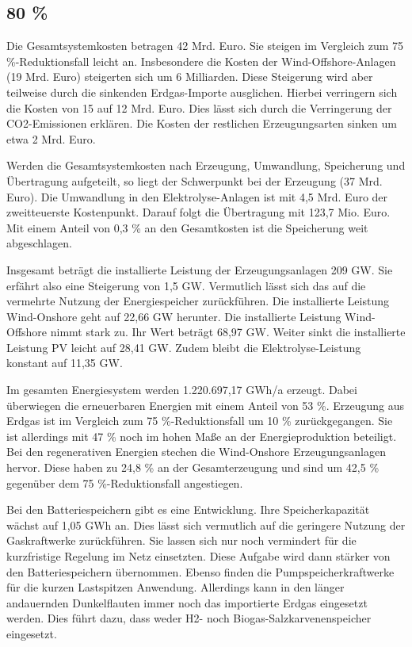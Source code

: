 

\subsection{80 \%}
Die Gesamtsystemkosten betragen 42 Mrd. Euro. Sie steigen im Vergleich zum 75 \%-Reduktionsfall leicht an. Insbesondere die Kosten der Wind-Offshore-Anlagen (19 Mrd. Euro) steigerten sich um 6 Milliarden. Diese Steigerung wird aber teilweise durch die sinkenden Erdgas-Importe ausglichen. Hierbei verringern sich die Kosten von 15 auf 12 Mrd. Euro. Dies lässt sich durch die Verringerung der CO2-Emissionen erklären. Die Kosten der restlichen Erzeugungsarten sinken um etwa 2 Mrd. Euro.

Werden die Gesamtsystemkosten nach Erzeugung, Umwandlung, Speicherung und Übertragung aufgeteilt, so liegt der Schwerpunkt bei der Erzeugung (37 Mrd. Euro). Die Umwandlung in den Elektrolyse-Anlagen ist mit 4,5 Mrd. Euro der zweitteuerste Kostenpunkt. Darauf folgt die Übertragung mit 123,7 Mio. Euro. Mit einem Anteil von 0,3 \% an den Gesamtkosten ist die Speicherung weit abgeschlagen.

Insgesamt beträgt die installierte Leistung der Erzeugungsanlagen 209 GW. Sie erfährt also eine Steigerung von 1,5 GW. Vermutlich lässt sich das auf die vermehrte Nutzung der Energiespeicher zurückführen. Die installierte Leistung Wind-Onshore geht auf 22,66 GW herunter. Die installierte Leistung Wind-Offshore nimmt stark zu. Ihr Wert beträgt 68,97 GW.  Weiter sinkt die installierte Leistung PV leicht auf 28,41 GW. Zudem bleibt die Elektrolyse-Leistung konstant auf 11,35 GW. 

Im gesamten Energiesystem werden 1.220.697,17 GWh/a erzeugt. Dabei überwiegen die erneuerbaren Energien mit einem Anteil von 53 \%. Erzeugung aus Erdgas ist im Vergleich zum 75 \%-Reduktionsfall um 10 \% zurückgegangen. Sie ist allerdings mit 47 \% noch im hohen Maße an der Energieproduktion beteiligt. Bei den regenerativen Energien stechen die Wind-Onshore Erzeugungsanlagen hervor. Diese haben zu 24,8 \% an der Gesamterzeugung und sind um 42,5 \% gegenüber dem 75 \%-Reduktionsfall angestiegen. 

Bei den Batteriespeichern gibt es eine Entwicklung. Ihre Speicherkapazität wächst auf 1,05 GWh an. Dies lässt sich vermutlich auf die geringere Nutzung der Gaskraftwerke zurückführen. Sie lassen sich nur noch vermindert für die kurzfristige Regelung im Netz einsetzten. Diese Aufgabe wird dann stärker von den Batteriespeichern übernommen. Ebenso finden die Pumpspeicherkraftwerke für die kurzen Lastspitzen Anwendung. Allerdings kann in den länger andauernden Dunkelflauten immer noch das importierte Erdgas eingesetzt werden. Dies führt dazu, dass weder H2- noch Biogas-Salzkarvenenspeicher eingesetzt. 

